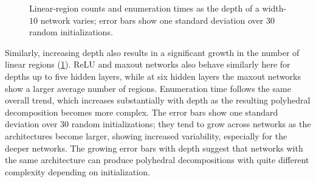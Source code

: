 \documentclass[10pt]{article}
\theoremstyle{definition}
\theoremstyle{remark}
\begin{document}
\begin{figure}[H]
    \centering
    \begin{subfigure}[t]{0.48\textwidth}
        \centering
    \end{subfigure}
    \hfill
    \begin{subfigure}[t]{0.48\textwidth}
        \centering
    \end{subfigure}
    \caption{Linear-region counts and enumeration times as the depth of a width-$10$ network varies; error bars show one standard deviation over 30 random initializations.}
    \label{fig:depth-linear-regions}
\end{figure}

Similarly, increasing depth also results in a significant growth in the number of linear regions (\cref{fig:depth-linear-regions}). ReLU and maxout networks also behave similarly here for depths up to five hidden layers, while at six hidden layers the maxout networks show a larger average number of regions. Enumeration time follows the same overall trend, which increases substantially with depth as the resulting polyhedral decomposition becomes more complex. The error bars show one standard deviation over 30 random initializations; they tend to grow across networks as the architectures become larger, showing increased variability, especially for the deeper networks. The growing error bars with depth suggest that networks with the same architecture can produce polyhedral decompositions with quite different complexity depending on initialization.
\end{document}
